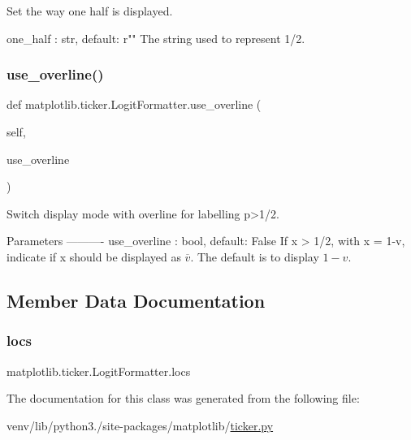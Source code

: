 \begin{DoxyVerb}Set the way one half is displayed.

one_half : str, default: r""
    The string used to represent 1/2.
\end{DoxyVerb}
 \mbox{\label{classmatplotlib_1_1ticker_1_1LogitFormatter_a06a8cecbc20660d3c48cff86356eb835}} 
\subsubsection{\texorpdfstring{use\+\_\+overline()}{use\_overline()}}
{\footnotesize\ttfamily def matplotlib.\+ticker.\+Logit\+Formatter.\+use\+\_\+overline (\begin{DoxyParamCaption}\item[{}]{self,  }\item[{}]{use\+\_\+overline }\end{DoxyParamCaption})}

\begin{DoxyVerb}Switch display mode with overline for labelling p>1/2.

Parameters
----------
use_overline : bool, default: False
    If x > 1/2, with x = 1-v, indicate if x should be displayed as
    $\overline{v}$. The default is to display $1-v$.
\end{DoxyVerb}
 

\subsection{Member Data Documentation}
\mbox{\label{classmatplotlib_1_1ticker_1_1LogitFormatter_a9aec1538b923c7a83ce5269964c33940}} 
\subsubsection{\texorpdfstring{locs}{locs}}
{\footnotesize\ttfamily matplotlib.\+ticker.\+Logit\+Formatter.\+locs}



The documentation for this class was generated from the following file\+:\begin{DoxyCompactItemize}
\item 
venv/lib/python3./site-\/packages/matplotlib/\hyperlink{ticker_8py}{ticker.\+py}\end{DoxyCompactItemize}
